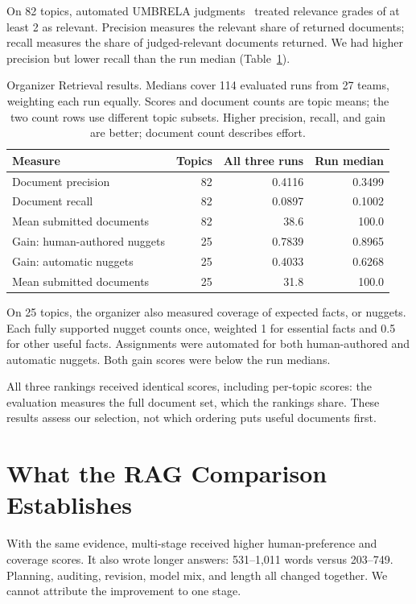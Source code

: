 \documentclass[11pt,letterpaper]{article}
\begin{document}
On 82 topics, automated UMBRELA judgments~\cite{umbrela} treated relevance grades of at least 2 as relevant. Precision measures the relevant share of returned documents; recall measures the share of judged-relevant documents returned. We had higher precision but lower recall than the run median (Table~\ref{tab:official-retrieval}).

\begin{table}[H]
\centering\small
\begin{tabular}{@{}lrrr@{}}
\toprule
Measure & Topics & All three runs & Run median\\
\midrule
Document precision & 82 & 0.4116 & 0.3499\\
Document recall & 82 & 0.0897 & 0.1002\\
Mean submitted documents & 82 & 38.6 & 100.0\\
\midrule
Gain: human-authored nuggets & 25 & 0.7839 & 0.8965\\
Gain: automatic nuggets & 25 & 0.4033 & 0.6268\\
Mean submitted documents & 25 & 31.8 & 100.0\\
\bottomrule
\end{tabular}
\caption{Organizer Retrieval results. Medians cover 114 evaluated runs from 27 teams, weighting each run equally. Scores and document counts are topic means; the two count rows use different topic subsets. Higher precision, recall, and gain are better; document count describes effort.}
\label{tab:official-retrieval}
\end{table}

On 25 topics, the organizer also measured coverage of expected facts, or nuggets. Each fully supported nugget counts once, weighted 1 for essential facts and 0.5 for other useful facts. Assignments were automated for both human-authored and automatic nuggets. Both gain scores were below the run medians.

All three rankings received identical scores, including per-topic scores: the evaluation measures the full document set, which the rankings share. These results assess our selection, not which ordering puts useful documents first.



\section{What the RAG Comparison Establishes}
With the same evidence, multi-stage received higher human-preference and coverage scores. It also wrote longer answers: 531--1,011 words versus 203--749. Planning, auditing, revision, model mix, and length all changed together. We cannot attribute the improvement to one stage.
\end{document}
